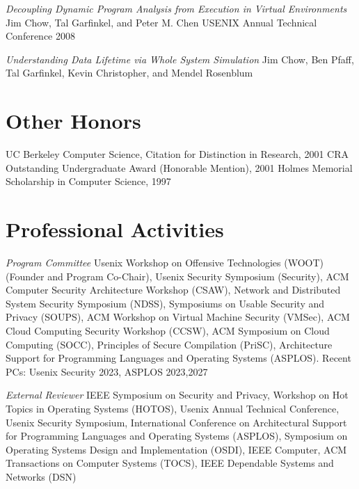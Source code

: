 \begin{resume}
{\em Decoupling Dynamic Program Analysis from Execution in Virtual \newline
Environments} Jim Chow, Tal Garfinkel, and Peter M. Chen
\newline USENIX Annual Technical Conference 2008

{\em Understanding Data Lifetime via Whole System Simulation} \newline Jim
Chow, Ben Pfaff, Tal Garfinkel, Kevin Christopher, and Mendel Rosenblum


\section{\sc Other Honors}

UC Berkeley Computer Science,  Citation for Distinction in Research, 2001 \newline
CRA Outstanding Undergraduate Award (Honorable Mention), 2001 \newline
Holmes Memorial Scholarship in Computer Science, 1997 \newline


\section{\sc Professional Activities}


{\em Program Committee}\newline
Usenix Workshop on Offensive Technologies (WOOT) (Founder and Program
Co-Chair), Usenix Security Symposium (Security), ACM Computer Security
Architecture Workshop (CSAW), Network and Distributed System Security Symposium
(NDSS), Symposiums on Usable Security and Privacy (SOUPS), ACM Workshop on
Virtual Machine Security (VMSec), ACM Cloud Computing Security Workshop (CCSW),
ACM Symposium on Cloud Computing (SOCC), Principles of Secure Compilation
(PriSC), Architecture Support for Programming Languages and Operating Systems
(ASPLOS). Recent PCs: Usenix Security 2023, ASPLOS 2023,2027

\pagebreak

{\em External Reviewer}\newline
IEEE Symposium on Security and Privacy, Workshop on Hot Topics in
Operating Systems (HOTOS), Usenix Annual Technical Conference,
Usenix Security Symposium, International Conference on Architectural
Support for Programming Languages and Operating Systems (ASPLOS),
Symposium on Operating Systems Design and Implementation (OSDI),
IEEE Computer, ACM Transactions on Computer Systems (TOCS),
IEEE Dependable Systems and Networks (DSN)


\end{resume}
